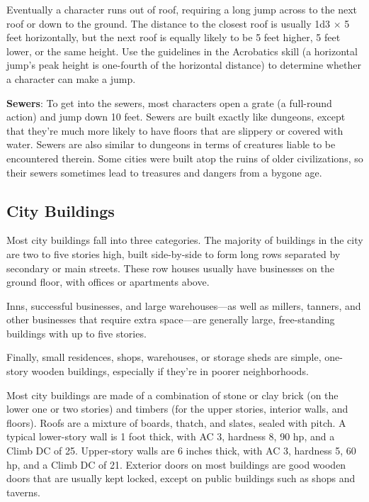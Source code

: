 Eventually a character runs out of roof, requiring a long jump across to the next roof or down to the ground. The distance to the closest roof is usually 1d3 \mbox{$\times$} 5 feet horizontally, but the next roof is equally likely to be 5 feet higher, 5 feet lower, or the same height. Use the guidelines in the Acrobatics skill (a horizontal jump's peak height is one-fourth of the horizontal distance) to determine whether a character can make a jump.
				
\textbf{Sewers}: To get into the sewers, most characters open a grate (a full-round action) and jump down 10 feet. Sewers are built exactly like dungeons, except that they're much more likely to have floors that are slippery or covered with water. Sewers are also similar to dungeons in terms of creatures liable to be encountered therein. Some cities were built atop the ruins of older civilizations, so their sewers sometimes lead to treasures and dangers from a bygone age.
				
\subsection{City Buildings}

				
Most city buildings fall into three categories. The majority of buildings in the city are two to five stories high, built side-by-side to form long rows separated by secondary or main streets. These row houses usually have businesses on the ground floor, with offices or apartments above.
				
Inns, successful businesses, and large warehouses---as well as millers, tanners, and other businesses that require extra space---are generally large, free-standing buildings with up to five stories. 
				
Finally, small residences, shops, warehouses, or storage sheds are simple, one-story wooden buildings, especially if they're in poorer neighborhoods.
				
Most city buildings are made of a combination of stone or clay brick (on the lower one or two stories) and timbers (for the upper stories, interior walls, and floors). Roofs are a mixture of boards, thatch, and slates, sealed with pitch. A typical lower-story wall is 1 foot thick, with AC 3, hardness 8, 90 hp, and a Climb DC of 25. Upper-story walls are 6 inches thick, with AC 3, hardness 5, 60 hp, and a Climb DC of 21. Exterior doors on most buildings are good wooden doors that are usually kept locked, except on public buildings such as shops and taverns.
				
